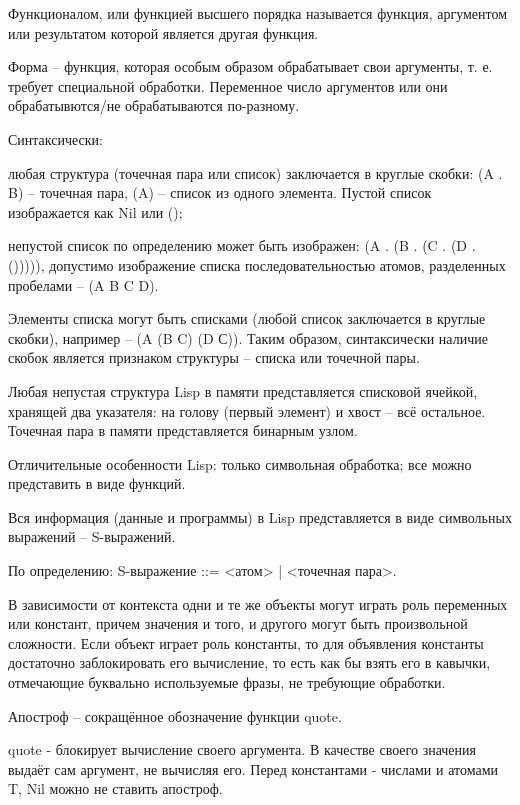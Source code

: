 \documentclass[12pt]{report}
\begin{document}

Функционалом, или функцией высшего порядка называется функция, аргументом или  результатом которой является другая функция.

Форма -- функция, которая особым образом обрабатывает свои аргументы, т. е. требует специальной обработки. Переменное число аргументов или они обрабатывются/не обрабатываются по-разному.



Синтаксически:

любая структура (точечная пара или список) заключается в круглые скобки: (A . B) – точечная пара, (A) – список из одного элемента. Пустой список изображается как Nil или ();

непустой список по определению может быть изображен: (A . (B . (C . (D . ())))),  допустимо изображение списка последовательностью атомов, разделенных пробелами – (A B C D).

Элементы списка могут быть списками (любой список заключается в круглые скобки), например – (A (B C) (D С)). Таким образом, синтаксически наличие скобок является признаком структуры – списка или точечной пары.

Любая непустая структура Lisp в памяти представляется списковой ячейкой, хранящей два указателя: на голову (первый элемент) и хвост – всё остальное. Точечная пара в памяти представляется бинарным узлом.



Отличительные особенности Lisp: только символьная обработка; все можно представить в виде функций.
	
Вся информация (данные и программы) в Lisp представляется в виде символьных выражений – S-выражений. 

По определению: S-выражение ::= <атом> | <точечная пара>.
	
В зависимости от контекста одни и те же объекты могут играть роль переменных или констант, причем значения и того, и другого могут быть произвольной сложности. Если объект играет роль константы, то для объявления константы достаточно заблокировать его вычисление, то есть как бы взять его в кавычки, отмечающие буквально используемые фразы, не требующие обработки. 

Апостроф – сокращённое обозначение функции quote.

quote - блокирует вычисление своего аргумента. В качестве своего значения выдаёт сам аргумент, не вычисляя его. Перед константами - числами и атомами T, Nil можно не ставить апостроф.
\end{document}
